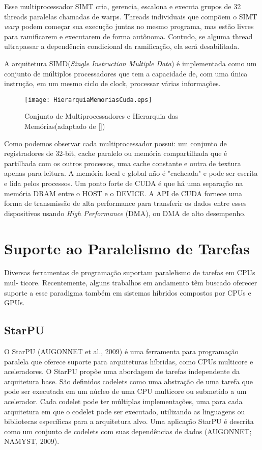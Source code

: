 Esse multiprocessador SIMT cria, gerencia, escalona e executa grupos de 32 threads paralelas chamadas de warps. Threads individuais que compõem o SIMT \textit{warp} podem começar sua execução juntas no mesmo programa, mas estão livres para ramificarem e executarem de forma autônoma. Contudo, se alguma thread ultrapassar a dependência condicional da ramificação, ela será desabilitada. 

A arquitetura SIMD(\textit{Single Instruction Multiple Data}) é implementada como um conjunto de múltiplos processadores que tem a capacidade de, com uma única instrução, em um mesmo ciclo de clock, processar várias informações.

\begin{figure}[!htb]
	\begin{center}
	\centering
			\texttt{[image: HierarquiaMemoriasCuda.eps]}
	\caption{Conjunto de Multiprocessadores e Hierarquia das Memórias(adaptado de [\cite{cuda}])}
	\label{fig: SIMT}
	\end{center}
\end{figure}

Como podemos observar cada multiprocessador possui: um conjunto de registradores de 32-bit, cache paralelo ou memória compartilhada que é partilhada com os outros processos, uma cache constante e outra de textura apenas para leitura. A memória local e global não é "cacheada" e pode ser escrita e lida pelos processos.
Um ponto forte de CUDA é que há uma separação na memória DRAM entre o HOST e o DEVICE. A API de CUDA fornece uma forma de transmissão de alta performance para transferir os dados entre esses dispositivos usando \textit{High Performance} (DMA), ou DMA de alto desempenho.

\section{Suporte ao Paralelismo de Tarefas}
Diversas ferramentas de programação suportam paralelismo de tarefas em CPUs mul- ticore. Recentemente, alguns trabalhos em andamento têm buscado oferecer suporte a esse paradigma também em sistemas híbridos compostos por CPUs e GPUs.



\subsection{StarPU}

O StarPU (AUGONNET et al., 2009) é uma ferramenta para programação paralela que oferece suporte para arquiteturas híbridas, como CPUs multicore e aceleradores. O StarPU propõe uma abordagem de tarefas independente da arquitetura base. São definidos codelets como uma abstração de uma tarefa que pode ser executada em um núcleo de uma CPU multicore ou submetido a um acelerador. Cada codelet pode ter múltiplas implementações, uma para cada arquitetura em que o codelet pode ser executado, utilizando as linguagens ou bibliotecas específicas para a arquitetura alvo. Uma aplicação StarPU é descrita como um conjunto de codelets com suas dependências de dados (AUGONNET; NAMYST, 2009).

